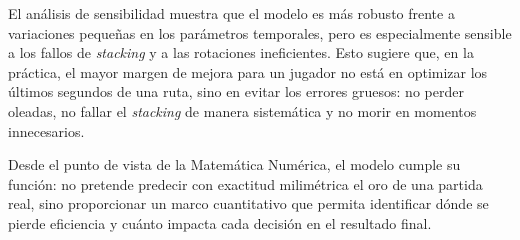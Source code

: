 El análisis de sensibilidad muestra que el modelo es más robusto frente a variaciones pequeñas en los parámetros temporales, pero es especialmente sensible a los fallos de \textit{stacking} y a las rotaciones ineficientes. Esto sugiere que, en la práctica, el mayor margen de mejora para un jugador no está en optimizar los últimos segundos de una ruta, sino en evitar los errores gruesos: no perder oleadas, no fallar el \textit{stacking} de manera sistemática y no morir en momentos innecesarios.

Desde el punto de vista de la Matemática Numérica, el modelo cumple su función: no pretende predecir con exactitud milimétrica el oro de una partida real, sino proporcionar un marco cuantitativo que permita identificar dónde se pierde eficiencia y cuánto impacta cada decisión en el resultado final.